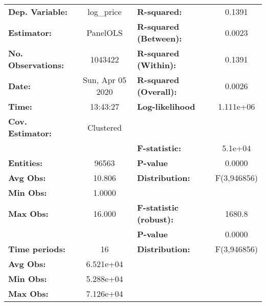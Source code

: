 \documentclass{report}
\begin{document}
\begin{center}
\begin{tabular}{lclc}
\toprule
\textbf{Dep. Variable:}        &     log\_price     & \textbf{  R-squared:         }   &      0.1391      \\
\textbf{Estimator:}            &      PanelOLS      & \textbf{  R-squared (Between):}  &      0.0023      \\
\textbf{No. Observations:}     &      1043422       & \textbf{  R-squared (Within):}   &      0.1391      \\
\textbf{Date:}                 &  Sun, Apr 05 2020  & \textbf{  R-squared (Overall):}  &      0.0026      \\
\textbf{Time:}                 &      13:43:27      & \textbf{  Log-likelihood     }   &    1.111e+06     \\
\textbf{Cov. Estimator:}       &     Clustered      & \textbf{                     }   &                  \\
\textbf{}                      &                    & \textbf{  F-statistic:       }   &      5.1e+04     \\
\textbf{Entities:}             &       96563        & \textbf{  P-value            }   &      0.0000      \\
\textbf{Avg Obs:}              &       10.806       & \textbf{  Distribution:      }   &   F(3,946856)    \\
\textbf{Min Obs:}              &       1.0000       & \textbf{                     }   &                  \\
\textbf{Max Obs:}              &       16.000       & \textbf{  F-statistic (robust):} &      1680.8      \\
\textbf{}                      &                    & \textbf{  P-value            }   &      0.0000      \\
\textbf{Time periods:}         &         16         & \textbf{  Distribution:      }   &   F(3,946856)    \\
\textbf{Avg Obs:}              &     6.521e+04      & \textbf{                     }   &                  \\
\textbf{Min Obs:}              &     5.288e+04      & \textbf{                     }   &                  \\
\textbf{Max Obs:}              &     7.126e+04      & \textbf{                     }   &                  \\
\bottomrule
\end{tabular}
\begin{tabular}{lcccccc}

\end{tabular}
\end{center}
\end{document}
